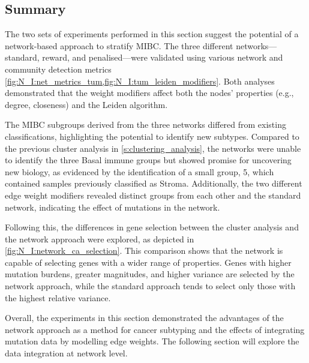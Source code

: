 \subsection{Summary}

The two sets of experiments performed in this section suggest the potential of a network-based approach to stratify MIBC. The three different networks—standard, reward, and penalised—were validated using various network and community detection metrics \cref{fig:N_I:net_metrics_tum,fig:N_I:tum_leiden_modifiers}. Both analyses demonstrated that the weight modifiers affect both the nodes' properties (e.g., degree, closeness) and the Leiden algorithm.

The MIBC subgroups derived from the three networks differed from existing classifications, highlighting the potential to identify new subtypes. Compared to the previous cluster analysis in \cref{s:clustering_analysis}, the networks were unable to identify the three Basal immune groups but showed promise for uncovering new biology, as evidenced by the identification of a small group, 5, which contained samples previously classified as Stroma. Additionally, the two different edge weight modifiers revealed distinct groups from each other and the standard network, indicating the effect of mutations in the network.

Following this, the differences in gene selection between the cluster analysis and the network approach were explored, as depicted in \cref{fig:N_I:network_ca_selection}. This comparison shows that the network is capable of selecting genes with a wider range of properties. Genes with higher mutation burdens, greater magnitudes, and higher variance are selected by the network approach, while the standard approach tends to select only those with the highest relative variance.

Overall, the experiments in this section demonstrated the advantages of the network approach as a method for cancer subtyping and the effects of integrating mutation data by modelling edge weights. The following section will explore the data integration at network level.

